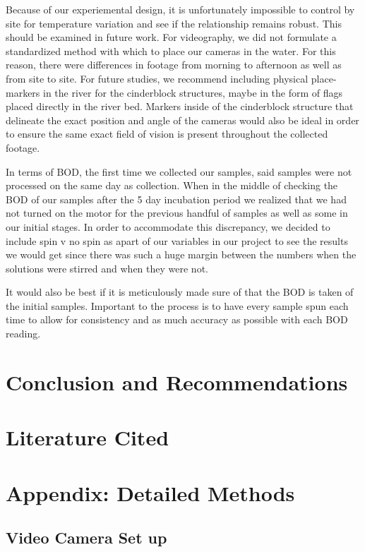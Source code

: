 \documentclass{article}\usepackage[]{graphicx}\usepackage[]{color}
\begin{document}
Because of our experiemental design, it is unfortunately impossible to control by site for temperature variation and see if the relationship remains robust. This should be examined in future work. For videography, we did not formulate a standardized method with which to place our cameras in the water. For this reason, there were differences in footage from morning to afternoon as well as from site to site. For future studies, we recommend including physical place-markers in the river for the cinderblock structures, maybe in the form of flags placed directly in the river bed. Markers inside of the cinderblock structure that delineate the exact position and angle of the cameras would also be ideal in order to ensure the same exact field of vision is present throughout the collected footage. 

In terms of BOD, the first time we collected our samples, said samples were not processed on the same day as collection. When in the middle of checking the BOD of our samples after the 5 day incubation period we realized that we had not turned on the motor for the previous handful of samples as well as some in our initial stages. In order to accommodate this discrepancy, we decided to include spin v no spin as apart of our variables in our project to see the results we would get since there was such a huge margin between the numbers when the solutions were stirred and when they were not.

It would also be best if it is meticulously made sure of that the BOD is taken of the initial samples. Important to the process is to have every sample spun each time to allow for consistency and as much accuracy as possible with each BOD reading. 


\section{Conclusion and Recommendations}


\section{Literature Cited}




\newpage
\section{Appendix: Detailed Methods}

\subsection{Video Camera Set up}
\end{document}
